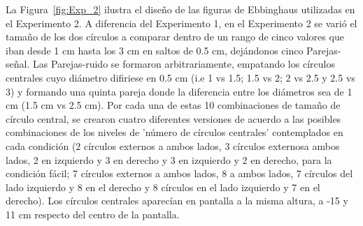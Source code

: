 \begin{itemize}
La Figura~\ref{fig:Exp_2} ilustra el diseño de las figuras de Ebbinghaus utilizadas en el Experimento 2. A diferencia del Experimento 1, en el Experimento 2 se varió el tamaño de los dos círculos a comparar dentro de un rango de cinco valores que iban desde 1 cm hasta los 3 cm en saltos de 0.5 cm, dejándonos cinco Parejas-señal. Las Parejas-ruido se formaron arbitrariamente, empatando los círculos centrales cuyo diámetro difiriese en 0.5 cm (i.e 1 vs 1.5; 1.5 vs 2; 2 vs 2.5 y 2.5 vs 3) y formando una quinta pareja donde la diferencia entre los diámetros sea de 1 cm (1.5 cm vs 2.5 cm). Por cada una de estas 10 combinaciones de tamaño de círculo central, se crearon cuatro diferentes versiones de acuerdo a las posibles combinaciones de los niveles de 'número de círculos centrales' contemplados en cada condición (2 círculos externos a ambos lados, 3 círculos externosa ambos lados, 2 en izquierdo y 3 en derecho y 3 en izquierdo y 2 en derecho, para la condición fácil; 7 círculos externos a ambos lados, 8 a ambos lados, 7 círculos del lado izquierdo y 8 en el derecho y 8 círculos en el lado izquierdo y 7 en el derecho). Los círculos centrales aparecían en pantalla a la misma altura, a -15 y 11 cm respecto del centro de la pantalla.\\


\end{itemize}
